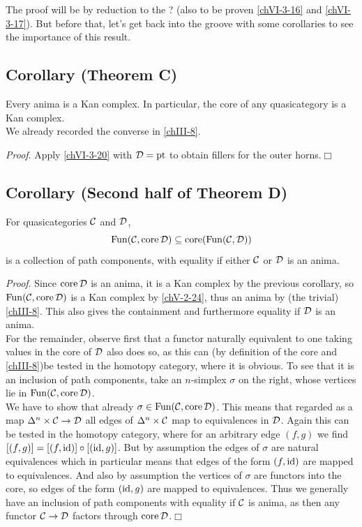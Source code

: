         The proof will be by reduction to the ? (also to be proven \ref{chVI-3-16} and \ref{chVI-3-17}). But before that, let's get back into the groove with some corollaries to see the importance of this result.

    \subsection{Corollary (Theorem C)}\label{chVI-3-21}
        Every anima is a Kan complex. In particular, the core of any quasicategory is a Kan complex.\\
        We already recorded the converse in \ref{chIII-8}.\\
        \smallskip

        \emph{Proof}. Apply \ref{chVI-3-20} with $\mathcal{D} = \operatorname{pt}$ to obtain fillers for the outer horns.\hfill$\Box$

    \subsection{Corollary (Second half of Theorem D)}\label{chVI-3-22}
        For quasicategories $\mathcal{C}$ and $\mathcal{D}$,
        \begin{equation*}
            \operatorname{Fun}(\mathcal{C}, \operatorname{core} \mathcal{D}) \subseteq \operatorname{core}(\operatorname{Fun}(\mathcal{C}, \mathcal{D}))
        \end{equation*}
        is a collection of path components, with equality if either $\mathcal{C}$ or $\mathcal{D}$ is an anima.
        \smallskip

        \emph{Proof}. Since $\operatorname{core} \mathcal{D}$ is an anima, it is a Kan complex by the previous corollary, so $\operatorname{Fun}(\mathcal{C}, \operatorname{core} \mathcal{D})$ is a Kan complex by \ref{chV-2-24}, thus an anima by (the trivial) \ref{chIII-8}. This also gives the containment and furthermore equality if $\mathcal{D}$ is an anima.\\
        For the remainder, observe first that a functor naturally equivalent to one taking values in the core of $\mathcal{D}$ also does so, as this can (by definition of the core and \ref{chIII-8})be tested in the homotopy category, where it is obvious. To see that it is an inclusion of path components, take an $n$-simplex $\sigma$ on the right, whose vertices lie in $\operatorname{Fun}(\mathcal{C}, \operatorname{core} \mathcal{D})$. \\
        We have to show that already $\sigma \in \operatorname{Fun}(\mathcal{C}, \operatorname{core} \mathcal{D})$. This means that regarded as a map $\Delta^n \times \mathcal{C} \to \mathcal{D}$ all edges of $\Delta^n \times \mathcal{C}$ map to equivalences in $\mathcal{D}$. Again this can be tested in the homotopy category, where for an arbitrary edge $(f, g)$ we find $[(f, g)] = [(f, \operatorname{id})] \circ [(\operatorname{id}, g)]$. But by assumption the edges of $\sigma$ are natural equivalences which in particular means that edges of the form $(f, \operatorname{id})$ are mapped to equivalences. And also by assumption the vertices of $\sigma$ are functors into the core, so edges of the form $(\operatorname{id}, g)$ are mapped to equivalences. Thus we generally have an inclusion of path components with equality if $\mathcal{C}$ is anima, as then any functor $\mathcal{C} \to \mathcal{D}$ factors through $\operatorname{core} \mathcal{D}$.\hfill$\Box$
        \medskip

